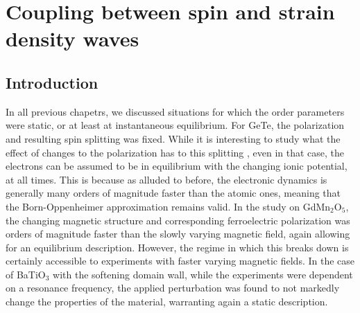 \chapter{Coupling between spin and strain density waves \label{ch:CrSDW}}
\section{Introduction}
In all previous chapetrs, we discussed situations for which the order parameters were static, or at least at instantaneous equilibrium.
For GeTe, the polarization and resulting spin splitting was fixed.
While it is interesting to study what the effect of changes to the polarization has to this splitting \cite{Monserrat2017}, even in that case, the electrons can be assumed to be in equilibrium with the changing ionic potential, at all times.
This is because as alluded to before, the electronic dynamics is generally many orders of magnitude faster than the atomic ones, meaning that the Born-Oppenheimer approximation remains valid.
In the study on GdMn$_2$O$_5$, the changing magnetic structure and corresponding ferroelectric polarization was orders of magnitude faster than the slowly varying magnetic field, again allowing for an equilibrium description.
However, the regime in which this breaks down is certainly accessible to experiments with faster varying magnetic fields.
In the case of BaTiO$_3$ with the softening domain wall, while the experiments were dependent on a resonance frequency, the applied perturbation was found to not markedly change the properties of the material, warranting again a static description. 

